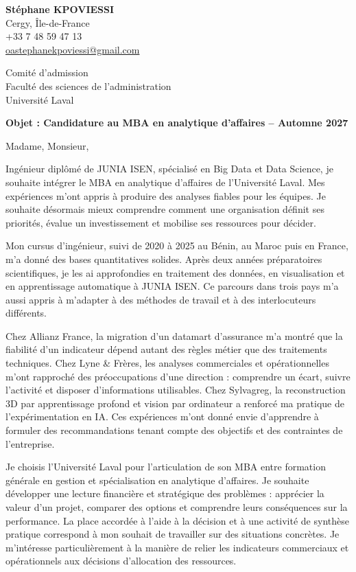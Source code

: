 \documentclass[12pt,a4paper]{article}
\begin{document}
\thispagestyle{empty}
\textbf{Stéphane KPOVIESSI}\\
{\small Cergy, Île-de-France\\
+33 7 48 59 47 13\\
\href{mailto:oastephanekpoviessi@gmail.com}{oastephanekpoviessi@gmail.com}}

\vspace{0.4em}
Comité d'admission\\
Faculté des sciences de l'administration\\
Université Laval

\vspace{0.3em}
\textbf{Objet : Candidature au MBA en analytique d'affaires -- Automne 2027}

Madame, Monsieur,

Ingénieur diplômé de JUNIA ISEN, spécialisé en Big Data et Data Science, je souhaite intégrer le MBA en analytique d'affaires de l'Université Laval. Mes expériences m'ont appris à produire des analyses fiables pour les équipes. Je souhaite désormais mieux comprendre comment une organisation définit ses priorités, évalue un investissement et mobilise ses ressources pour décider.

Mon cursus d'ingénieur, suivi de 2020 à 2025 au Bénin, au Maroc puis en France, m'a donné des bases quantitatives solides. Après deux années préparatoires scientifiques, je les ai approfondies en traitement des données, en visualisation et en apprentissage automatique à JUNIA ISEN. Ce parcours dans trois pays m'a aussi appris à m'adapter à des méthodes de travail et à des interlocuteurs différents.

Chez Allianz France, la migration d'un datamart d'assurance m'a montré que la fiabilité d'un indicateur dépend autant des règles métier que des traitements techniques. Chez Lyne \& Frères, les analyses commerciales et opérationnelles m'ont rapproché des préoccupations d'une direction : comprendre un écart, suivre l'activité et disposer d'informations utilisables. Chez Sylvagreg, la reconstruction 3D par apprentissage profond et vision par ordinateur a renforcé ma pratique de l'expérimentation en IA. Ces expériences m'ont donné envie d'apprendre à formuler des recommandations tenant compte des objectifs et des contraintes de l'entreprise.

Je choisis l'Université Laval pour l'articulation de son MBA entre formation générale en gestion et spécialisation en analytique d'affaires. Je souhaite développer une lecture financière et stratégique des problèmes : apprécier la valeur d'un projet, comparer des options et comprendre leurs conséquences sur la performance. La place accordée à l'aide à la décision et à une activité de synthèse pratique correspond à mon souhait de travailler sur des situations concrètes. Je m'intéresse particulièrement à la manière de relier les indicateurs commerciaux et opérationnels aux décisions d'allocation des ressources.
\end{document}
